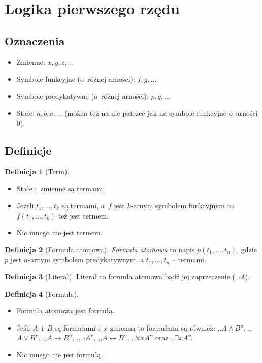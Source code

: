 \documentclass[10pt,a4paper]{article}
\theoremstyle{plain}
\theoremstyle{definition}
\newtheorem*{definition}{Definicja}
\newcommand{\impl}{\rightarrow}
\begin{document}
\section{Logika pierwszego rzędu}
\subsection{Oznaczenia}
\begin{itemize}
  \item Zmienne: $x, y, z,\ldots$
  \item Symbole funkcyjne (o~różnej arności): $f, g,\ldots$
  \item Symbole predykatywne (o~różnej arności): $p, q,\ldots$
  \item Stałe: $a,b,c,\ldots$ (można też na nie patrzeć jak na symbole funkcyjne
    o~arności 0).
\end{itemize}

\subsection{Definicje}
\begin{definition}[Term]
  ~\begin{itemize}
    \item Stałe i~zmienne są termami.
    \item Jeżeli $t_1,\ldots,t_k$ są termami, a~$f$ jest $k$-arnym symbolem
      funkcyjnym to $f(t_1,\ldots,t_k)$ też jest termem.
    \item Nic innego nie jest termem.
  \end{itemize}
\end{definition}

\begin{definition}[Formuła atomowa]
  \emph{Formuła atomowa} to napis $p(t_1,\ldots,t_n)$, gdzie $p$ jest $n$-arnym
  symbolem predykatywnym, a $t_1,\ldots,t_n$ -- termami.
\end{definition}

\begin{definition}[Literał]
  Literał to formuła atomowa bądź jej zaprzeczenie ($\lnot A$).
\end{definition}

\begin{definition}[Formuła]
  ~\begin{itemize}
    \item Formuła atomowa jest formułą.
    \item Jeśli $A$~i~$B$ są formułami i~$x$ zmienną to formułami są również:
    ,,$A\land B$'', ,,$A\lor B$'', ,,$A\impl B$'', ,,$\lnot A$'',
    ,,$A\leftrightarrow B$'', ,,$\forall x A$'' oraz ,,$\exists x A$''.
    \item Nic innego nie jest formułą.
  \end{itemize}
\end{definition}
\end{document}
